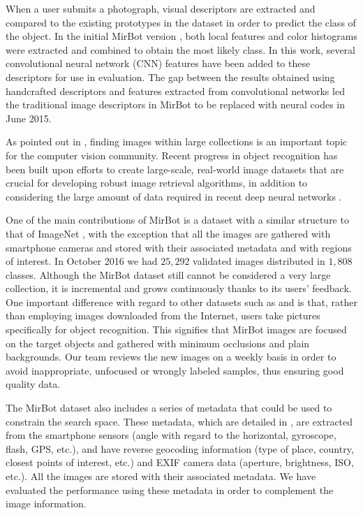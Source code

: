 \documentclass[final, twocolumn]{elsarticle}
\begin{document}
When a user submits a photograph, visual descriptors are extracted and compared to the existing prototypes in the dataset in order to predict the class of the object. In the initial MirBot version \cite{MirBot:System}, both local features and color histograms were extracted and combined to obtain the most likely class. In this work, several convolutional neural network (CNN) features have been added to these descriptors for use in evaluation. The gap between the results obtained using handcrafted descriptors and features extracted from convolutional networks led the traditional image descriptors in MirBot to be replaced with neural codes in June 2015.

As pointed out in \cite{Torralba200880Recognition.}, finding images within large collections is an important topic for the computer vision community. Recent progress in object recognition has been built upon efforts to create large-scale, real-world image datasets \citep{Khosla2012UndoingBias, Deng2009ImageNet:Database} that are crucial for developing robust image retrieval algorithms, in addition to considering the large amount of data required in recent deep neural networks \citep{LeCun2015DeepLearning}.

One of the main contributions of MirBot is a dataset with a similar structure to that of ImageNet \citep{Deng2009ImageNet:Database}, with the exception that all the images are gathered with smartphone cameras and stored with their associated metadata and with regions of interest. In October 2016 we had $25,292$ validated images distributed in $1,808$ classes. Although the MirBot dataset still cannot be considered a very large collection, it is incremental and grows continuously thanks to its users' feedback. One important difference with regard to other datasets such as \cite{Torralba200880Recognition.} and \cite{Deng2009ImageNet:Database} is that, rather than employing images downloaded from the Internet, users take pictures specifically for object recognition. This signifies that MirBot images are focused on the target objects and gathered with minimum occlusions and plain backgrounds. Our team reviews the new images on a weekly basis in order to avoid inappropriate, unfocused or wrongly labeled samples, thus ensuring good quality data.

The MirBot dataset also includes a series of metadata that could be used to constrain the search space. These metadata, which are detailed in \cite{MirBot:System}, are extracted from the smartphone sensors (angle with regard to the horizontal, gyroscope, flash, GPS, etc.), and have reverse geocoding information (type of place, country, closest points of interest, etc.) and EXIF camera data (aperture, brightness, ISO, etc.). All the images are stored with their associated metadata. We have evaluated the performance using these metadata in order to complement the image information.
\end{document}
